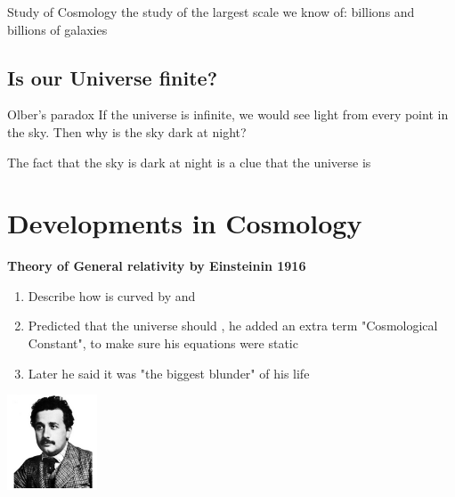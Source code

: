 \begin{greenblock}
    \begin{worddef}{Study of Cosmology}
        the study of the largest scale we know of: billions and billions of galaxies
    \end{worddef}
\end{greenblock}

\subsection{Is our Universe finite?}
\begin{multicols}{2}
   \begin{greenblock}
    \begin{worddef} {Olber's paradox}
        If the universe is infinite, we would see light from every point in the sky. Then why is the sky dark at night?
    \end{worddef}
\end{greenblock}
The fact that the sky is dark at night is a clue that the universe is  
\end{multicols}

\section{Developments in Cosmology}
\begin{paracol}{2}
    \textbf{Theory of General relativity by Einsteinin 1916}
\begin{leftcolumn}
    \begin{enumerate}
        \item Describe how  is curved by  and 
        \item Predicted that the universe should , he added an extra term "Cosmological Constant", to make sure his equations were static
        \item Later he said it was "the biggest blunder" of his life
    \end{enumerate}
\end{leftcolumn}
    
\begin{rightcolumn}
    \begin{center}
        \includegraphics[width=0.2\textwidth]{pictures/Einestin.png}
    \end{center}
    
\end{rightcolumn}
   
\end{paracol}

